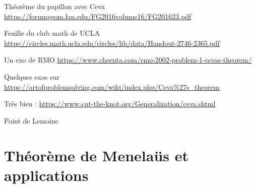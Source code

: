 Théorème du papillon avec Ceva \url{https://forumgeom.fau.edu/FG2016volume16/FG201623.pdf}

Feuille du club math de UCLA \url{https://circles.math.ucla.edu/circles/lib/data/Handout-2746-2365.pdf}


Un exo de RMO \url{https://www.cheenta.com/rmo-2002-problem-1-cevas-theorem/}

Quelques exos sur \url{https://artofproblemsolving.com/wiki/index.php/Ceva%27s_theorem}

Très bien : \url{https://www.cut-the-knot.org/Generalization/ceva.shtml}

Point de Lemoine




\section{Théorème de Menelaüs et applications}



\begin{exo}[Menelaus]
\begin{center}
\begin{tikzpicture}
\end{tikzpicture}
\end{center}
\begin{hint}
\end{hint}
\begin{sol}
\end{sol}
\end{exo}

\begin{exo}
\begin{center}
\begin{tikzpicture}
\end{tikzpicture}
\end{center}
\begin{hint}
\end{hint}
\begin{sol}
\end{sol}
\end{exo}

\begin{exo}
\begin{center}
\begin{tikzpicture}
\end{tikzpicture}
\end{center}
\begin{hint}
\end{hint}
\begin{sol}
\end{sol}
\end{exo}



\indications
\correction



